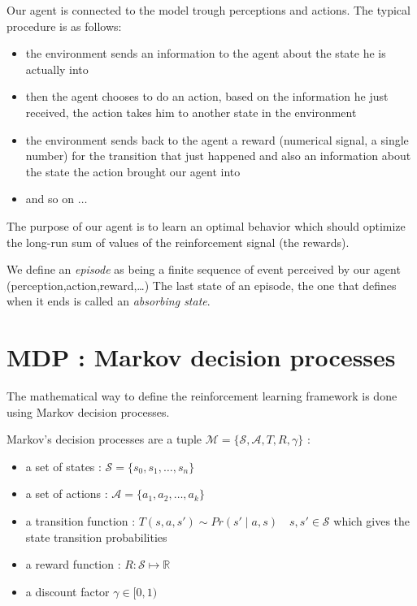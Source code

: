 \documentclass[14pt,a4paper]{article}
\theoremstyle{definition}
\begin{document}
Our agent is connected to the model trough perceptions and actions. The typical procedure is as follows: 
\begin{itemize}
\item the environment sends an information to the agent about the state he is actually into
\item then the agent chooses to do an action, based on the information he just received, the action takes him to another state in the environment
\item the environment sends back to the agent a reward (numerical signal, a single number) for the transition that just happened and also an information about the state the action brought our agent into
\item and so on $\ldots$
\end{itemize}

The purpose of our agent is to learn an optimal behavior which should optimize the long-run sum of values of the reinforcement signal (the rewards). \citep{KLMSurvey}

We define an \emph{episode} as being a finite sequence of event perceived by our agent (perception,action,reward,\ldots) The last state of an episode, the one that defines when it ends is called an \emph{absorbing state}.

\section{MDP : Markov decision processes} \label{def_MDP}



The mathematical way to define the reinforcement learning framework is done using Markov decision processes.

Markov's decision processes are a tuple  $\mathcal{M}=\{\mathcal{S},\mathcal{A},T,R,\gamma\}$ : 

\begin{itemize}
\item a set of states : $\mathcal{S}=\{s_0,s_1,\ldots,s_n\}$
\item a set of actions  : $\mathcal{A}=\{a_1,a_2,\ldots ,a_k\}$
\item a transition function :  $T(s,a,s') \sim  Pr(s'\mid a, s) \quad s,s' \in \mathcal{S}$ which gives the state transition probabilities
\item a reward function : $R:\mathcal{S}\mapsto \mathbb{R} $
\item a discount factor $\gamma \in [0,1)$
\end{itemize}
\end{document}
